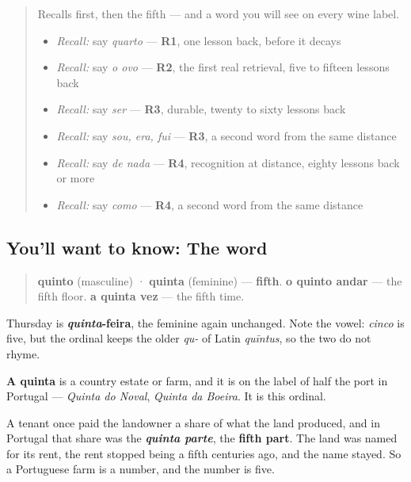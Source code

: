 \label{lesson:PT-C27-quinto}



\begin{quote}
Recalls first, then the fifth — and a word you will see on every wine label.

\begin{itemize}
\raggedright
  \item \emph{Recall:} say \emph{quarto} — \textbf{R1}, one lesson back, before it decays
  \item \emph{Recall:} say \emph{o ovo} — \textbf{R2}, the first real retrieval, five to fifteen lessons back
  \item \emph{Recall:} say \emph{ser} — \textbf{R3}, durable, twenty to sixty lessons back
  \item \emph{Recall:} say \emph{sou, era, fui} — \textbf{R3}, a second word from the same distance
  \item \emph{Recall:} say \emph{de nada} — \textbf{R4}, recognition at distance, eighty lessons back or more
  \item \emph{Recall:} say \emph{como} — \textbf{R4}, a second word from the same distance
\end{itemize}
\end{quote}

\subsection*{You'll want to know: The word}
\begin{quote}
\textbf{quinto} (masculine) · \textbf{quinta} (feminine) — \textbf{fifth}. \textbf{o quinto andar} — the fifth floor. \textbf{a quinta vez} — the fifth time.
\end{quote}

Thursday is \textbf{\emph{quinta}-feira}, the feminine again unchanged. Note the vowel: \emph{cinco} is five, but the ordinal keeps the older \emph{qu-} of Latin \emph{quīntus}, so the two do not rhyme.

\begin{culture}
\textbf{A quinta} is a country estate or farm, and it is on the label of half the port in Portugal — \emph{Quinta do Noval}, \emph{Quinta da Boeira}. It is this ordinal.

A tenant once paid the landowner a share of what the land produced, and in Portugal that share was the \emph{\textbf{quinta parte}}, the \textbf{fifth part}. The land was named for its rent, the rent stopped being a fifth centuries ago, and the name stayed. So a Portuguese farm is a number, and the number is five.
\end{culture}

